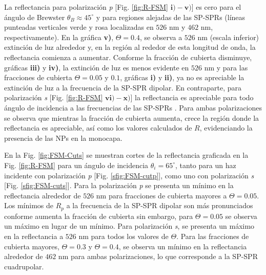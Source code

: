 La reflectancia para polarización \emph{p} [Fig. \ref{fig:R-FSM} $\mathbf{i)-v)}$] es cero para el ángulo de Brewster $\theta_B \approx 45^\circ$ y para regiones alejadas de las SP-SPRs (líneas punteadas verticales verde y rosa  localizadas en $526$ nm y $462$ nm, respectivamente). En la gráfica \textbf{v)}, $\Theta=0.4$,  se observa a $526$ nm (escala inferior) extinción de luz alrededor y, en la región al rededor de esta longitud de onda, la reflectancia comienza a aumentar. Conforme la fracción de cubierta disminuye, gráficas \textbf{iii)} y \textbf{iv)}, la extinción de luz es  menos evidente en $526$ nm y para las fracciones de cubierta $\Theta=0.05$ y $0.1$, gráficas \textbf{i)} y \textbf{ii)}, ya no es apreciable la extinción de luz a la frecuencia de la SP-SPR dipolar. En contraparte, para polarización \emph{s} [Fig. \ref{fig:R-FSM} $\mathbf{vi)-x)}$] la reflectancia es apreciable para todo ángulo de incidencia a las frecuencias de las SP-SPRs . Para ambas polarizaciones se observa que mientras la fracción de cubierta aumenta,  crece la región donde la reflectancia es apreciable, así como los valores calculados de $R$, evidenciando la presencia de las NPs en la monocapa.

En la Fig. \ref{fig:FSM-Cuts} se muestran cortes de la reflectancia graficada en la Fig. \ref{fig:R-FSM} para un ángulo de incidencia $\theta_i = 65^\circ$, tanto para un haz incidente con polarización \emph{p} [Fig. \ref{sfig:FSM-cutp}], como uno con polarización \emph{s} [Fig. \ref{sfig:FSM-cuts}]. Para la polarización \emph{p} se presenta un mínimo en la reflectancia alrededor de $526$ nm para fracciones de cubierta mayores a $\Theta = 0.05$. Los mínimos de $R_p$ a la frecuencia de la SP-SPR dipolar son más pronunciados conforme aumenta la fracción de cubierta sin embargo, para $\Theta=0.05$ se observa un máximo en lugar de un mínimo. Para polarización \emph{s}, se presenta un máximo en la reflectancia a $526$ nm para todos los valores de $\Theta$. Para las fracciones de cubierta mayores, $\Theta = 0.3$ y $\Theta = 0.4$,  se observa un  mínimo en la reflectancia alrededor de $462$ nm para ambas polarizaciones, lo que corresponde a la SP-SPR cuadrupolar.

